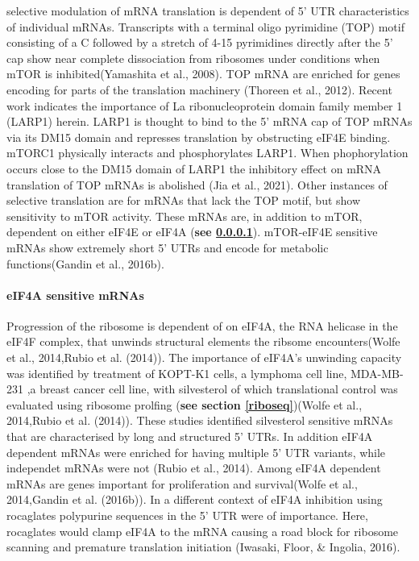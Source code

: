 \documentclass[12pt,openany]{book}
\begin{document}
selective modulation of mRNA translation is dependent of 5' UTR
characteristics of individual mRNAs. Transcripts with a terminal oligo
pyrimidine (TOP) motif consisting of a C followed by a stretch of 4-15
pyrimidines directly after the 5' cap show near complete dissociation
from ribosomes under conditions when mTOR is inhibited(Yamashita et al.,
2008). TOP mRNA are enriched for genes encoding for parts of the
translation machinery (Thoreen et al., 2012). Recent work indicates the
importance of La ribonucleoprotein domain family member 1 (LARP1)
herein. LARP1 is thought to bind to the 5' mRNA cap of TOP mRNAs via its
DM15 domain and represses translation by obstructing eIF4E binding.
mTORC1 physically interacts and phosphorylates LARP1. When
phophorylation occurs close to the DM15 domain of LARP1 the inhibitory
effect on mRNA translation of TOP mRNAs is abolished (Jia et al., 2021).
Other instances of selective translation are for mRNAs that lack the TOP
motif, but show sensitivity to mTOR activity. These mRNAs are, in
addition to mTOR, dependent on either eIF4E or eIF4A (\textbf{see
\ref{eif4a}}). mTOR-eIF4E sensitive mRNAs show extremely short 5' UTRs
and encode for metabolic functions(Gandin et al., 2016b).

\paragraph{eIF4A sensitive mRNAs} \label{eif4a}

Progression of the ribosome is dependent of on eIF4A, the RNA helicase
in the eIF4F complex, that unwinds structural elements the ribsome
encounters(Wolfe et al., 2014,Rubio et al. (2014)). The importance of
eIF4A's unwinding capacity was identified by treatment of KOPT-K1 cells,
a lymphoma cell line, MDA-MB-231 ,a breast cancer cell line, with
silvesterol of which translational control was evaluated using ribosome
prolfing (\textbf{see section \ref{riboseq}})(Wolfe et al., 2014,Rubio
et al. (2014)). These studies identified silvesterol sensitive mRNAs
that are characterised by long and structured 5' UTRs. In addition eIF4A
dependent mRNAs were enriched for having multiple 5' UTR variants, while
independet mRNAs were not (Rubio et al., 2014). Among eIF4A dependent
mRNAs are genes important for proliferation and survival(Wolfe et al.,
2014,Gandin et al. (2016b)). In a different context of eIF4A inhibition
using rocaglates polypurine sequences in the 5' UTR were of importance.
Here, rocaglates would clamp eIF4A to the mRNA causing a road block for
ribosome scanning and premature translation initiation (Iwasaki, Floor,
\& Ingolia, 2016).
\end{document}
